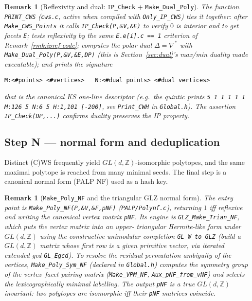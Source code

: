 \documentclass{amsart}
\newtheorem{remark}[theorem]{Remark}
\begin{document}
\begin{remark}[Reflexivity and dual: \texttt{IP\_Check} +
\texttt{Make\_Dual\_Poly}]\label{rmk:dual-code}
The function \texttt{PRINT\_CWS} (\texttt{cws.c}, active when compiled with
\texttt{Only\_IP\_CWS}) ties it together: after
\texttt{Make\_CWS\_Points} it calls \texttt{IP\_Check(P,\&V,\&E)} to verify
$0$ is interior and to get facets \texttt{E}; tests reflexivity by the same
\texttt{E.e[i].c == 1} criterion of Remark~\ref{rmk:ipref-code}; computes the
polar dual $\Delta = \nabla^*$ with \texttt{Make\_Dual\_Poly(P,\&V,\&E,DP)}
(this is Section~\ref{sec:dual}'s max/min duality made executable); and
prints the signature
\begin{verbatim}
M:<#points> <#vertices>   N:<#dual points> <#dual vertices>
\end{verbatim}
that is the canonical KS one-line descriptor (e.g.\ the quintic prints
\texttt{5 1 1 1 1 1 M:126 5 N:6 5 H:1,101 [-200]}, see \texttt{Print\_CWH}
in \texttt{Global.h}). The assertion \texttt{IP\_Check(DP,...)} confirms
duality preserves the IP property.
\end{remark}

\subsection{Step N --- normal form and deduplication}
\label{sec:algo-nf}

Distinct (C)WS frequently yield $GL(d,\mathbb{Z})$-isomorphic polytopes, and
the same maximal polytope is reached from many minimal seeds. The final step
is a canonical normal form (PALP NF) used as a hash key.

\begin{remark}[\texttt{Make\_Poly\_NF} and the triangular GLZ normal form]
\label{rmk:nf-code}
The entry point is \texttt{Make\_Poly\_NF(P,\&V,\&F,pNF)}
(\texttt{PALP/Polynf.c}), returning $1$ iff reflexive and writing the
canonical vertex matrix \texttt{pNF}. Its engine is
\texttt{GLZ\_Make\_Trian\_NF}, which puts the vertex matrix into an upper-
triangular Hermite-like form under $GL(d,\mathbb{Z})$ using the constructive
unimodular completion \texttt{GL\_W\_to\_GLZ} (build a $GL(d,\mathbb{Z})$
matrix whose first row is a given primitive vector, via iterated extended
gcd \texttt{GL\_Egcd}). To resolve the residual permutation ambiguity of the
vertices, \texttt{Make\_Poly\_Sym\_NF} (declared in \texttt{Global.h})
computes the symmetry group of the vertex--facet pairing matrix
(\texttt{Make\_VPM\_NF}, \texttt{Aux\_pNF\_from\_vNF}) and selects the
lexicographically minimal labelling. The output \texttt{pNF} is a true
$GL(d,\mathbb{Z})$ invariant: two polytopes are isomorphic iff their
\texttt{pNF} matrices coincide.
\end{remark}
\end{document}
